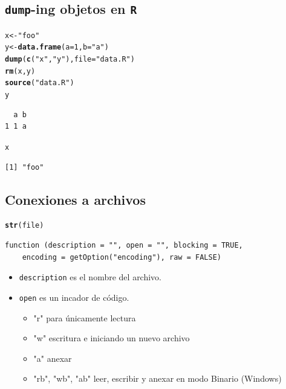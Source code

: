 \documentclass{article}\usepackage[]{graphicx}\usepackage[]{color}
\makeatletter
\newcommand{\hlnum}[1]{\textcolor[rgb]{0.686,0.059,0.569}{#1}}%
\newcommand{\hlstr}[1]{\textcolor[rgb]{0.192,0.494,0.8}{#1}}%
\newcommand{\hlstd}[1]{\textcolor[rgb]{0.345,0.345,0.345}{#1}}%
\newcommand{\hlkwb}[1]{\textcolor[rgb]{0.69,0.353,0.396}{#1}}%
\newcommand{\hlkwc}[1]{\textcolor[rgb]{0.333,0.667,0.333}{#1}}%
\newcommand{\hlkwd}[1]{\textcolor[rgb]{0.737,0.353,0.396}{\textbf{#1}}}%
\newenvironment{kframe}{%
 \def\at@end@of@kframe{}%
 \ifinner\ifhmode%
  \def\at@end@of@kframe{\end{minipage}}%
  \begin{minipage}{\columnwidth}%
 \fi\fi%
 \def\FrameCommand##1{\hskip\@totalleftmargin \hskip-\fboxsep
 \colorbox{shadecolor}{##1}\hskip-\fboxsep
     \hskip-\linewidth \hskip-\@totalleftmargin \hskip\columnwidth}%
 \MakeFramed {\advance\hsize-\width
   \@totalleftmargin\z@ \linewidth\hsize
   \@setminipage}}%
 {\par\unskip\endMakeFramed%
 \at@end@of@kframe}
\newenvironment{knitrout}{}{} %
\makeatother
\begin{document}
  \subsection{\texttt{dump}-ing objetos en \texttt{R}}
\begin{knitrout}
\color{fgcolor}\begin{kframe}
\begin{alltt}
  \hlstd{x} \hlkwb{<-} \hlstr{"foo"}
  \hlstd{y} \hlkwb{<-} \hlkwd{data.frame}\hlstd{(}\hlkwc{a} \hlstd{=} \hlnum{1}\hlstd{,} \hlkwc{b} \hlstd{=} \hlstr{"a"}\hlstd{)}
  \hlkwd{dump}\hlstd{(}\hlkwd{c}\hlstd{(}\hlstr{"x"}\hlstd{,} \hlstr{"y"}\hlstd{),} \hlkwc{file} \hlstd{=} \hlstr{"data.R"}\hlstd{)}
  \hlkwd{rm}\hlstd{(x, y)}
  \hlkwd{source}\hlstd{(}\hlstr{"data.R"}\hlstd{)}
  \hlstd{y}
\end{alltt}
\begin{verbatim}
  a b
1 1 a
\end{verbatim}
\begin{alltt}
  \hlstd{x}
\end{alltt}
\begin{verbatim}
[1] "foo"
\end{verbatim}
\end{kframe}
\end{knitrout}

  \subsection{Conexiones a archivos}
\begin{knitrout}
\color{fgcolor}\begin{kframe}
\begin{alltt}
\hlkwd{str}\hlstd{(file)}
\end{alltt}
\begin{verbatim}
function (description = "", open = "", blocking = TRUE, 
    encoding = getOption("encoding"), raw = FALSE)  
\end{verbatim}
\end{kframe}
\end{knitrout}
  \begin{itemize}
    \item \texttt{description} es el nombre del archivo.
    \item \texttt{open} es un incador de código.
      \begin{itemize}
        \item "r" para únicamente lectura
        \item "w" escritura e iniciando un nuevo archivo
        \item "a" anexar
        \item "rb", "wb", "ab" leer, escribir y anexar en modo Binario (Windows) 
      \end{itemize}
  \end{itemize}
  
\end{document}
